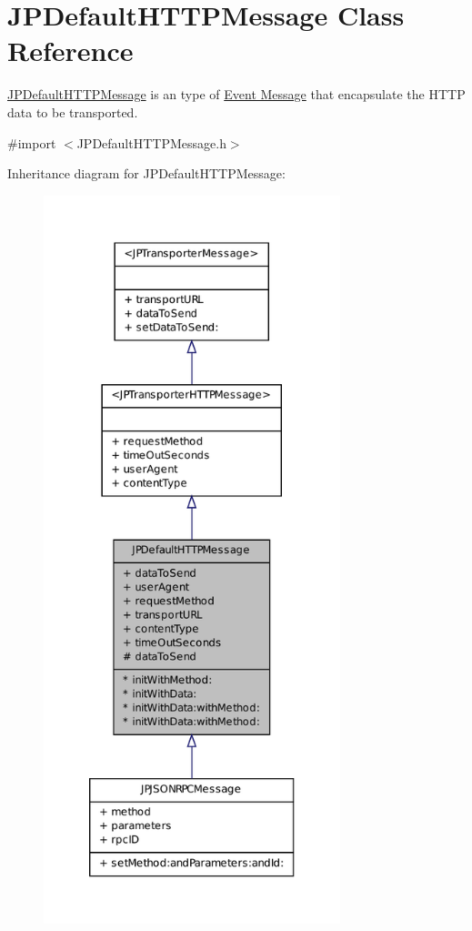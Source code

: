 \hypertarget{a00012}{
\section{JPDefaultHTTPMessage Class Reference}
\label{a00012}
}


\hyperlink{a00012}{JPDefaultHTTPMessage} is an type of \hyperlink{a00006}{Event Message} that encapsulate the HTTP data to be transported.  




{\ttfamily \#import $<$JPDefaultHTTPMessage.h$>$}



Inheritance diagram for JPDefaultHTTPMessage:
\nopagebreak
\begin{figure}[H]
\begin{center}
\leavevmode
\includegraphics[height=600pt]{a00097}
\end{center}
\end{figure}


